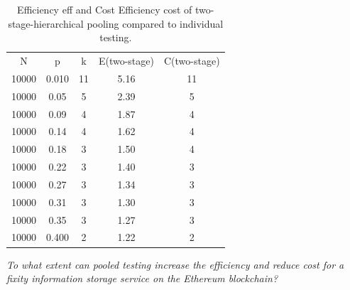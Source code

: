 \documentclass[final]{vutinfth}
\begin{document}
\begin{table}[t]
    \centering
    \begin{tabular}{ c c c c c}
        N & p & k & E(\acrshort{two-stage}) & C(\acrshort{two-stage}) \\
        10000 & 0.010 & 11 & 5.16 & 11 \\ 
        \hline
        10000 & 0.05 & 5 & 2.39 & 5 \\  
        \hline
        10000 & 0.09 & 4 & 1.87 & 4 \\  
        \hline
        10000 & 0.14 & 4 & 1.62 & 4 \\  
        \hline
        10000 & 0.18 & 3 & 1.50 & 4  \\
        \hline
        10000 & 0.22 & 3 & 1.40 & 3  \\
        \hline
        10000 & 0.27 & 3 & 1.34 & 3  \\
        \hline
        10000 & 0.31 & 3 & 1.30 & 3  \\
        \hline
        10000 & 0.35 & 3 & 1.27 & 3  \\
        \hline
        10000 & 0.400 & 2 & 1.22 & 2  
    \end{tabular}
    \caption{Efficiency \acrshort{eff} and Cost Efficiency \acrshort{cost} of two-stage-hierarchical pooling compared to individual testing.}
    \label{tb:expected costs}
\end{table}

\textit{To what extent can pooled testing increase the efficiency and reduce cost for a fixity information storage service on the Ethereum blockchain?}
\end{document}
